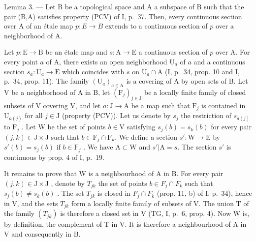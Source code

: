 Lemma 3. --- Let B be a topological space and A a subspace of B such that the pair (B,A) satisfies property (PCV) of I, p.~37. Then, every continuous section over A of an étale map \(p\colon E \to B\) extends to a continuous section of \(p\) over a neighborhood of A.

Let \(p \colon \mathrm{E} \to \mathrm{B}\) be an étale map and \(s \colon \mathrm{A} \to \mathrm{E}\) a continuous section of \(p\) over A. For every point \(a\) of A, there exists an open neighborhood \(\mathrm{U}_a\) of \(a\) and a continuous section \(s_a \colon \mathrm{U}_a \to \mathrm{E}\) which coincides with \(s\) on \(\mathrm{U}_a \cap \mathrm{A}\) (I, p.~34, prop. 10 and I, p.~34, prop. 11). The family \((\mathrm{U}_a)_{a \in \mathrm{A}}\) is a covering of A by open sets of B. Let V be a neighborhood of A in B, let \((\mathrm{F}_j)_{j \in \mathrm{J}}\) be a locally finite family of closed subsets of V covering V, and let \(a \colon \mathrm{J} \to \mathrm{A}\) be a map such that \(\mathrm{F}_j\) is contained in \(\mathrm{U}_{a(j)}\) for all \(j \in \mathrm{J}\) (property (PCV)). Let us denote by \(s_j\) the restriction of \(s_{a(j)}\) to \(\mathrm{F}_j\) . Let W be the set of points \(b \in \mathrm{V}\) satisfying \(s_j(b) = s_k(b)\) for every pair \((j, k) \in \mathrm{J} \times \mathrm{J}\) such that \(b \in \mathrm{F}_j \cap \mathrm{F}_k\). We define a section \(s' \colon \mathrm{W} \to \mathrm{E}\) by \(s'(b) = s_j(b)\) if \(b \in \mathrm{F}_j\) . We have \(\mathrm{A} \subset \mathrm{W}\) and \(s' | \mathrm{A} = s\). The section \(s'\) is continuous by prop. 4 of I, p.~19.

It remains to prove that W is a neighbourhood of A in B. For every pair \((j,k)\in\mathrm{J}\times\mathrm{J}\) , denote by \(T_{jk}\) the set of points \(b\in F_{j}\cap F_{k}\) such that \(s_{j}(b)\neq s_{k}(b)\) . The set \(T_{jk}\) is closed in \(F_{j}\cap F_{k}\) (prop. 11, b) of I, p.~34), hence in V, and the sets \(T_{jk}\) form a locally finite family of subsets of V. The union T of the family \((T_{jk})\) is therefore a closed set in V (TG, I, p.~6, prop. 4). Now W is, by definition, the complement of T in V. It is therefore a neighbourhood of A in V and consequently in B.

